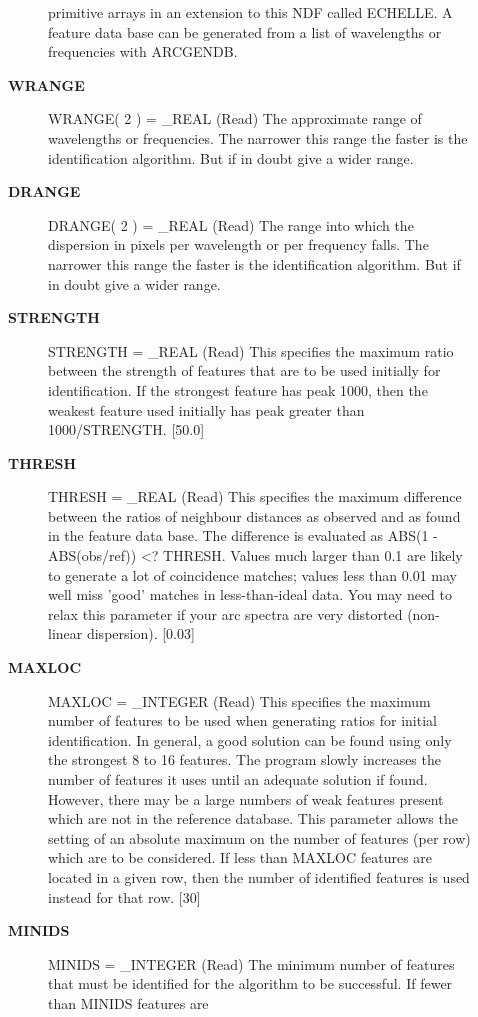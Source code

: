 \begin{description}
\begin{description}
   primitive arrays in an extension to this NDF called ECHELLE.
   A feature data base can be generated from a list of wavelengths
   or frequencies with ARCGENDB.
\item [{\bf WRANGE}]
WRANGE( 2 ) = _REAL (Read)
   The approximate range of wavelengths or frequencies. The
   narrower this range the faster is the identification algorithm.
   But if in doubt give a wider range.
\item [{\bf DRANGE}]
DRANGE( 2 ) = _REAL (Read)
   The range into which the dispersion in pixels per wavelength or
   per frequency falls. The narrower this range the faster is the
   identification algorithm. But if in doubt give a wider range.
\item [{\bf STRENGTH}]
STRENGTH = _REAL (Read)
   This specifies the maximum ratio between the strength of
   features that are to be used initially for identification. If
   the strongest feature has peak 1000, then the weakest
   feature used initially has peak greater than 1000/STRENGTH.
   [50.0]
\item [{\bf THRESH}]
THRESH = _REAL (Read)
   This specifies the maximum difference between the ratios of
   neighbour distances as observed and as found in the feature
   data base. The difference is evaluated as
      ABS(1 - ABS(obs/ref)) <? THRESH.
   Values much larger than 0.1 are likely to generate a lot of
   coincidence matches; values less than 0.01 may well miss 'good'
   matches in less-than-ideal data. You may need to relax this
   parameter if your arc spectra are very distorted (non-linear
   dispersion). [0.03]
\item [{\bf MAXLOC}]
MAXLOC = _INTEGER (Read)
   This specifies the maximum number of features to be used when
   generating ratios for initial identification. In general, a
   good solution can be found using only the strongest 8 to 16
   features. The program slowly increases the number of features
   it uses until an adequate solution if found. However, there may
   be a large numbers of weak features present which are not in
   the reference database. This parameter allows the setting of an
   absolute maximum on the number of features (per row) which
   are to be considered. If less than MAXLOC features are located
   in a given row, then the number of identified features is used
   instead for that row. [30]
\item [{\bf MINIDS}]
MINIDS = _INTEGER (Read)
   The minimum number of features that must be identified for the
   algorithm to be successful. If fewer than MINIDS features are

\end{description}
\end{description}

